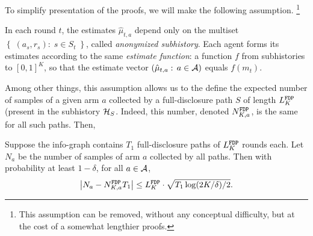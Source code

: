 To simplify presentation of the proofs, we will make the following assumption.%
\footnote{This assumption can be removed, without any conceptual difficulty, but at the cost of a somewhat lengthier proofs.}
 

\begin{assumption}\label{ass:simplifying}
In each round $t$, the estimates $\hat{\mu}_{t,a}$ depend only on the multiset 
    $\left\{\; (a_s,r_s):\;s\in S_t \;\right\}$,
called \emph{anonymized subhistory}. Each agent forms its estimates according to the same \emph{estimate function}: a function $f$ from subhistories to $[0,1]^K$, so that the estimate vector
        $(\hat{\mu}_{t,a}:\, a\in\mathcal{A})$
equals $f(m_t)$. 
\end{assumption}

Among other things, this assumption allows us to the define the expected number of samples of a given arm $a$ collected by a full-disclosure path $S$ of length $L^\mathtt{FDP}_K$ (\ie present in the subhistory $\mathcal{H}_{S}$. Indeed, this number, denoted $N^\mathtt{FDP}_{K,a}$, is the same for all such paths. Then,

\begin{lemma}\label{lem:t1runs}
Suppose the info-graph contains $T_1$ full-disclosure paths of $L^\mathtt{FDP}_K$ rounds each. Let $N_a$ be the number of samples of arm $a$ collected by all paths. Then with probability at
  least $1-\delta$, for all $a\in \mathcal{A}$,
  \[
    \left| N_a - N^\mathtt{FDP}_{K,a} T_1\right| \leq L^\mathtt{FDP}_K\cdot \sqrt{T_1 \log(2K/\delta) / 2}.
  \]
\end{lemma}






